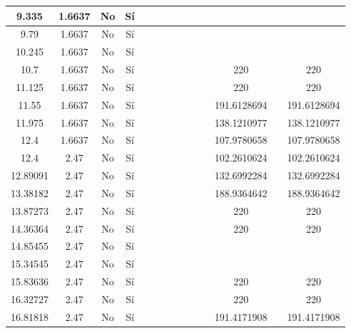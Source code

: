 \begin{table}[H]
{\begin{tabular}{|c|c|c|c|c|c|c|c|c|c|c|c|c|c|}
\hline
9.335 & 1.6637 & No  & Sí  &     &     &     &     &     &     &     &     &     &  \bigstrut\\
\hline
9.79 & 1.6637 & No  & Sí  &     &     &     &     &     &     &     &     &     &  \bigstrut\\
\hline
10.245 & 1.6637 & No  & Sí  &     &     &     &     &     &     &     &     &     &  \bigstrut\\
\hline
10.7 & 1.6637 & No  & Sí  &     &     &     &     &     &     &     & 220 &     & 220 \bigstrut\\
\hline
11.125 & 1.6637 & No  & Sí  &     &     &     &     &     &     &     & 220 &     & 220 \bigstrut\\
\hline
11.55 & 1.6637 & No  & Sí  &     &     &     &     &     &     &     & 191.6128694 &     & 191.6128694 \bigstrut\\
\hline
11.975 & 1.6637 & No  & Sí  &     &     &     &     &     &     &     & 138.1210977 &     & 138.1210977 \bigstrut\\
\hline
12.4 & 1.6637 & No  & Sí  &     &     &     &     &     &     &     & 107.9780658 &     & 107.9780658 \bigstrut\\
\hline
12.4 & 2.47 & No  & Sí  &     &     &     &     &     &     &     & 102.2610624 &     & 102.2610624 \bigstrut\\
\hline
12.89091 & 2.47 & No  & Sí  &     &     &     &     &     &     &     & 132.6992284 &     & 132.6992284 \bigstrut\\
\hline
13.38182 & 2.47 & No  & Sí  &     &     &     &     &     &     &     & 188.9364642 &     & 188.9364642 \bigstrut\\
\hline
13.87273 & 2.47 & No  & Sí  &     &     &     &     &     &     &     & 220 &     & 220 \bigstrut\\
\hline
14.36364 & 2.47 & No  & Sí  &     &     &     &     &     &     &     & 220 &     & 220 \bigstrut\\
\hline
14.85455 & 2.47 & No  & Sí  &     &     &     &     &     &     &     &     &     &  \bigstrut\\
\hline
15.34545 & 2.47 & No  & Sí  &     &     &     &     &     &     &     &     &     &  \bigstrut\\
\hline
15.83636 & 2.47 & No  & Sí  &     &     &     &     &     &     &     & 220 &     & 220 \bigstrut\\
\hline
16.32727 & 2.47 & No  & Sí  &     &     &     &     &     &     &     & 220 &     & 220 \bigstrut\\
\hline
16.81818 & 2.47 & No  & Sí  &     &     &     &     &     &     &     & 191.4171908 &     & 191.4171908 \bigstrut\\

\end{tabular}}
\end{table}
